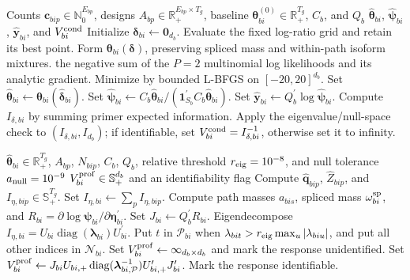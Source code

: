 \documentclass[11pt]{article}
\begin{document}
\begin{algorithm}[H]
\caption{Fit one pseudobulk's local path composition}
\label{alg:local-fit}
\begin{algorithmic}[1]
\Require Counts \(\bm c_{bip}\in\mathbb N_0^{E_{bp}}\), designs \(A_{bp}\in\mathbb R_+^{E_{bp}\times T_g}\), baseline \(\bm\theta_{bi}^{(0)}\in\mathbb R_+^{T_g}\), \(C_b\), and \(Q_b\)
\Ensure \(\widehat{\bm\theta}_{bi}\), \(\widehat{\bm\psi}_{bi}\), \(\widehat{\bm y}_{bi}\), and \(V_{bi}^{\rm cond}\)
\State Initialize \(\bm\delta_{bi}\gets\bm0_{d_b}\).
  \State Evaluate the fixed log-ratio grid and retain its best point.
\EndIf
{}
  \State Form \(\bm\theta_{bi}(\bm\delta)\), preserving spliced mass and within-path isoform mixtures.
  \State \Return the negative sum of the \(P=2\) multinomial log likelihoods and its analytic gradient.
\EndFunction
\State Minimize  by bounded L-BFGS on \([-20,20]^{d_b}\).
\State Set \(\widehat{\bm\theta}_{bi}\gets \bm\theta_{bi}(\widehat{\bm\delta}_{bi})\).
\State Set \(\widehat{\bm\psi}_{bi}\gets C_b\widehat{\bm\theta}_{bi}/ (\bm1_{S_b}^\prime C_b\widehat{\bm\theta}_{bi})\).
\State Set \(\widehat{\bm y}_{bi}\gets Q_b^\prime\log\widehat{\bm\psi}_{bi}\).
\State Compute \(I_{\delta,bi}\) by summing primer expected information.
\State Apply the eigenvalue/null-space check to \((I_{\delta,bi},I_{d_b})\); if identifiable, set \(V_{bi}^{\rm cond}=I_{\delta,bi}^{-1}\), otherwise set it to infinity.
\end{algorithmic}
\end{algorithm}

\begin{algorithm}[H]
\caption{Compute full-isoform nuisance (profile) covariance}
\label{alg:profile}
\begin{algorithmic}[1]
\Require \(\widehat{\bm\theta}_{bi}\in\mathbb R_+^{T_g}\), \(A_{bp}\), \(N_{bip}\), \(C_b\), \(Q_b\), relative threshold \(r_{\rm eig}=10^{-8}\), and null tolerance \(a_{\rm null}=10^{-9}\)
\Ensure \(V_{bi}^{\rm prof}\in\mathbb S_+^{d_b}\) and an identifiability flag
  \State Compute \(\widehat{\bm q}_{bip}\), \(\widehat Z_{bip}\), and \(I_{\eta,bip}\in\mathbb S_+^{T_g}\).
\EndFor
\State Set \(I_{\eta,bi}\gets\sum_p I_{\eta,bip}\).
\State Compute path masses \(a_{bis}\), spliced mass \(\omega_{bi}^{\rm sp}\), and \(R_{bi}=\partial\log\bm\psi_{bi}/\partial\bm\eta_{bi}^\prime\).
\State Set \(J_{bi}\gets Q_b^\prime R_{bi}\).
\State Eigendecompose \(I_{\eta,bi}=U_{bi}\operatorname{diag}(\bm\lambda_{bi})U_{bi}^\prime\).
\State Put \(t\) in \(\mathcal P_{bi}\) when \(\lambda_{bit}>r_{\rm eig}\max_u|\lambda_{biu}|\), and put all other indices in \(\mathcal N_{bi}\).
  \State Set \(V_{bi}^{\rm prof}\gets\infty_{d_b\times d_b}\) and mark the response unidentified.
\Else
  \State Set \(V_{bi}^{\rm prof}\gets J_{bi}U_{bi,+}\operatorname{diag} (\bm\lambda_{bi,\mathcal P}^{-1})U_{bi,+}^\prime J_{bi}^\prime\).
  \State Mark the response identifiable.
\EndIf
\end{algorithmic}
\end{algorithm}
\end{document}
